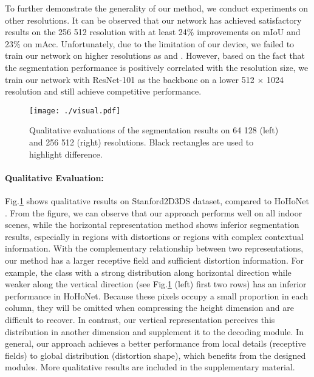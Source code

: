 \documentclass[runningheads]{llncs}
\begin{document}
	To further demonstrate the generality of our method, we conduct experiments on other resolutions.
	It can be observed that our network has achieved satisfactory results on the 256  512 resolution with at least 24\% improvements on mIoU and 23\% on mAcc.
	Unfortunately, due to the limitation of our device, we failed to train our network on higher resolutions as \cite{eder2020tangent} and \cite{sun2021hohonet}.
	However, based on the fact that the segmentation performance is positively correlated with the resolution size, we train our network with ResNet-101 as the backbone on a lower 512 × 1024 resolution and still achieve competitive performance.
	
	
	\begin{figure}[t]
		\centering
		\texttt{[image: ./visual.pdf]}
		\caption{Qualitative evaluations of the segmentation results on 64  128 (left) and 256  512 (right) resolutions.
			Black rectangles are used to highlight difference.}
		\label{segmentation map}
	\end{figure}
	
	
	\paragraph{Qualitative Evaluation:} Fig.\ref{segmentation map} shows qualitative results on Stanford2D3DS dataset, compared to HoHoNet \cite{sun2021hohonet}.
	From the figure, we can observe that our approach performs well on all indoor scenes, while the horizontal representation method shows inferior segmentation results, especially in regions with distortions or regions with complex contextual information.
	With the complementary relationship between two representations, our method has a larger receptive field and sufficient distortion information.
	For example, the class with a strong distribution along horizontal direction while weaker along the vertical direction (see Fig.\ref{segmentation map} (left) first two rows) has an inferior performance in HoHoNet.
	Because these pixels occupy a small proportion in each column, they will be omitted when compressing the height dimension and are difficult to recover.
	In contrast, our vertical representation perceives this distribution in another dimension and supplement it to the decoding module.
	In general, our approach achieves a better performance from local details (receptive fields) to global distribution (distortion shape), which benefits from the designed modules. More qualitative results are included in the supplementary material.
	
\end{document}
